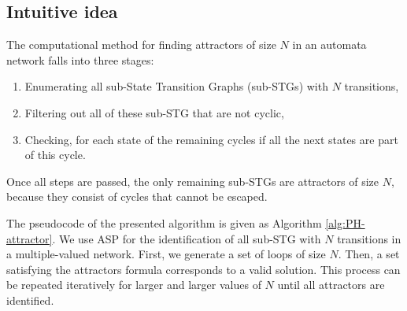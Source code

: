 \subsection{Intuitive idea}
The computational method for finding attractors of size $N$ in an automata network falls into three stages:
\begin{enumerate}
  \item Enumerating all sub-State Transition Graphs (sub-STGs)
    with $N$ transitions,
  \item Filtering out all of these sub-STG that are not cyclic,
  \item Checking, for each state of the remaining cycles
    if all the next states are part of this cycle.
\end{enumerate}
Once all steps are passed, the only remaining sub-STGs are attractors of size $N$,
because they consist of cycles that cannot be escaped.

The pseudocode of the presented algorithm is given as Algorithm \ref{alg:PH-attractor}. We use ASP for the identification of all sub-STG with $N$ transitions in a multiple-valued network.  First, we generate a set of loops of size $N$. Then, a set satisfying the attractors formula corresponds to a valid solution. This process can be repeated iteratively for larger and larger values of $N$ until all attractors are identified.


